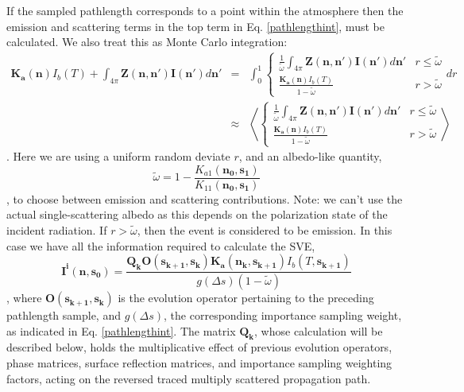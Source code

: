 If the sampled pathlength corresponds to a point within the
atmosphere then the emission and scattering terms in the top term in
Eq. \ref{pathlengthint}, must be calculated.  We also treat this as
Monte Carlo integration:
\begin{eqnarray}
\mathbf{K_a(n)}I_b(T)
+\int_{4\pi}\mathbf{Z(n,n')}\mathbf{I(n')}d\mathbf{n'}&=&
\int_0^1\left\{\begin{array}{rl}
\frac{1}{\tilde{\omega}}\int_{4\pi}\mathbf{Z(n,n')}\mathbf{I(n')}d\mathbf{n'}
& r \le \tilde{\omega}\\
\frac{\mathbf{K_a(n)}I_b(T)}{1-\tilde{\omega}}& r >
\tilde{\omega}\end{array}dr\right.\nonumber\\
&\approx&\left\langle\left\{\begin{array}{rl}
\frac{1}{\tilde{\omega}}\int_{4\pi}\mathbf{Z(n,n')}\mathbf{I(n')}d\mathbf{n'}
& r \le \tilde{\omega}\\
\frac{\mathbf{K_a(n)}I_b(T)}{1-\tilde{\omega}}& r >
\tilde{\omega}\end{array}\right.\right\rangle
\label{emiss-or-scatter}
\end{eqnarray}.
Here we are using a uniform random deviate $r$, and an
albedo-like quantity,
\begin{equation}
\tilde{\omega}=1-\frac{K_{a1}(\mathbf{n_{0},s_{1}})}{K_{11}(\mathbf{n_{0},s_{1}})}
\end{equation}
, to choose between emission and scattering contributions.
Note: we can't use the actual single-scattering albedo as this depends
on the polarization state of the incident radiation.  If
$r>\tilde{\omega}$, then the event is considered to be emission.  In
this case we have all the information required to calculate the SVE,
\begin{equation}
\mathbf{I^i(n,s_0)}=\frac{\mathbf{Q_k O(s_{k+1},s_k)}
  \mathbf{K_a(n_k,s_{k+1})} I_b(T,\mathbf{s_{k+1}})}
  {g\left(\Delta s\right)\left(1-\tilde{\omega}\right)}
\label{Iemission}
\end{equation}
, where $\mathbf{O(s_{k+1},s_k)}$ is the evolution operator
pertaining to the preceding pathlength sample, and $g\left(\Delta
s\right)$, the corresponding importance sampling weight, as indicated
in Eq. \ref{pathlengthint}.  The matrix $\mathbf{Q_k}$, whose
calculation will be described below, holds the
multiplicative effect of previous evolution operators, phase matrices,
surface reflection matrices, and importance sampling weighting
factors, acting on the reversed traced multiply scattered propagation
path. 

